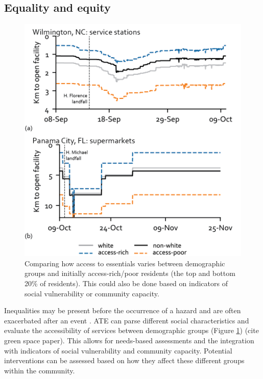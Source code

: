 \documentclass[9pt,twocolumn,twoside,lineno]{pnas-new}
\begin{document}
\subsection*{Equality and equity}
\begin{figure}
    \centering
    \includegraphics[width=\linewidth]{report/fig/equality.png}
    \caption{Comparing how access to essentials varies between demographic groups and initially access-rich/poor residents (the top and bottom 20\% of residents). This could also be done based on indicators of social vulnerability or community capacity.}
    \label{fig:equality}
\end{figure}
Inequalities may be present before the occurrence of a hazard and are often exacerbated after an event \cite{Gardoni2018-xu}.
ATE can parse different social characteristics and evaluate the accessibility of services between demographic groups (Figure \ref{fig:equality}) (cite green space paper).
This allows for needs-based assessments and the integration with indicators of social vulnerability and community capacity.
Potential interventions can be assessed based on how they affect these different groups within the community.

\end{document}
